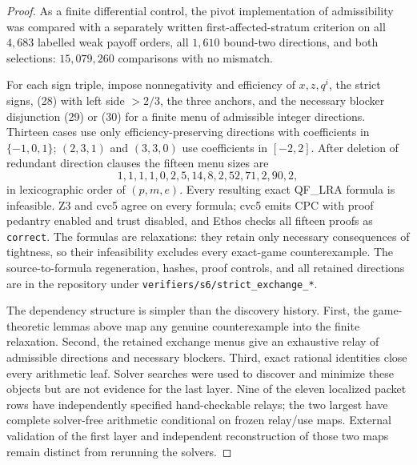 \documentclass[11pt]{article}
\begin{document}
\begin{proof}
As a finite differential control, the pivot implementation of admissibility
was compared with a separately written first-affected-stratum criterion on
all $4{,}683$ labelled weak payoff orders, all $1{,}610$ bound-two directions,
and both selections: $15{,}079{,}260$ comparisons with no mismatch.

For each sign triple, impose nonnegativity and efficiency of $x,z,q^i$, the
strict signs, (28) with left side $>2/3$, the three anchors, and the necessary
blocker disjunction (29) or (30) for a finite menu of admissible integer
directions.  Thirteen cases use only efficiency-preserving directions with
coefficients in $\{-1,0,1\}$; $(2,3,1)$ and $(3,3,0)$ use coefficients in
$[-2,2]$.  After deletion of redundant direction clauses the fifteen menu
sizes are
\[
 1,1,1,1,0,2,5,14,8,2,52,71,2,90,2,                  \tag{31}
\]
in lexicographic order of $(p,m,e)$.  Every resulting exact QF\_LRA formula
is infeasible.  Z3 and cvc5 agree on every formula; cvc5 emits CPC with proof
pedantry enabled and trust disabled, and Ethos checks all fifteen proofs as
\texttt{correct}.  The formulas are relaxations: they retain only necessary
consequences of tightness, so their infeasibility excludes every exact-game
counterexample.  The source-to-formula regeneration, hashes, proof controls,
and all retained directions are in the repository under
\texttt{verifiers/s6/strict\_exchange\_*}.

The dependency structure is simpler than the discovery history.  First, the
game-theoretic lemmas above map any genuine counterexample into the finite
relaxation.  Second, the retained exchange menus give an exhaustive relay of
admissible directions and necessary blockers.  Third, exact rational
identities close every arithmetic leaf.  Solver searches were used to discover
and minimize these objects but are not evidence for the last layer.  Nine of
the eleven localized packet rows have independently specified hand-checkable
relays; the two largest have complete solver-free arithmetic conditional on
frozen relay/use maps.  External validation of the first layer and independent
reconstruction of those two maps remain distinct from rerunning the solvers.


\end{proof}
\end{document}
